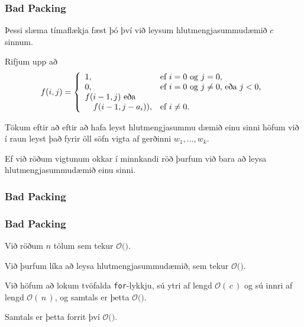 {
	\frametitle{Bad Packing}
	{
		\item<1-> Þessi slæma tímaflækja fæst þó því við leysum hlutmengjasummudæmið $c$ sinnum.
		\item<2-> Rifjum upp að
		\[
			f(i, j) =
			\left \{
			\env{array}
			{
				{l l}
				1, & \text{ef $i = 0$ og $j = 0$},\\
				0, & \text{ef $i = 0$ og $j \neq 0$, eða $j < 0$},\\
				f(i - 1, j) \text{ eða }\\
					\quad f(i - 1, j - a_i)), & \text{ef $i \neq 0$}.
			}
			\right .
		\]
		\item<3-> Tökum eftir að eftir að hafa leyst hlutmengjasummu dæmið einu sinni höfum við í raun leyst það fyrir öll söfn vigta
					af gerðinni $w_1, \dots, w_k$.
		\item<4-> Ef við röðum vigtunum okkar í minnkandi röð þurfum við bara að leysa hlutmengjasummudæmið einu sinni.
	}
}

{
	\frametitle{Bad Packing}
}

{
	\frametitle{Bad Packing}
	{
		\item<1-> Við röðum $n$ tölum sem tekur $\mathcal{O}($\onslide<2->{$n \log n$}$)$.
		\item<3-> Við þurfum líka að leysa hlutmengjasummudæmið, sem tekur $\mathcal{O}($\onslide<4->{$c \cdot n$}$)$.
		\item<5-> Við höfum að lokum tvöfalda \texttt{for}-lykkju,
					sú ytri af lengd $\mathcal{O}(\,c\,)$ og sú innri af lengd $\mathcal{O}(\,n\,)$,
					og samtals er þetta $\mathcal{O}($\onslide<6->{$c \cdot n$}$)$.
		\item<7-> Samtals er þetta forrit því $\mathcal{O}($\onslide<8->{$c \cdot n$}$)$.
	}
}

{
}


